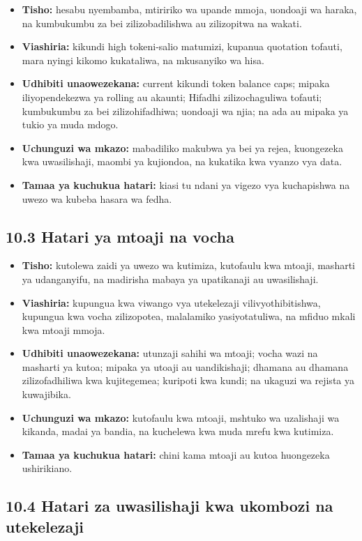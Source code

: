 \documentclass[11pt]{article}
\begin{document}
\begin{itemize}[leftmargin=*]
\item \textbf{Tisho:} hesabu nyembamba, mtiririko wa upande mmoja, uondoaji wa haraka, na kumbukumbu za bei zilizobadilishwa au zilizopitwa na wakati.
\item \textbf{Viashiria:} kikundi high tokeni-salio matumizi, kupanua quotation tofauti, mara nyingi kikomo kukataliwa, na mkusanyiko wa hisa.
\item \textbf{Udhibiti unaowezekana:} current kikundi token balance caps; mipaka iliyopendekezwa ya rolling au akaunti; Hifadhi zilizochaguliwa tofauti; kumbukumbu za bei zilizohifadhiwa; uondoaji wa njia; na ada au mipaka ya tukio ya muda mdogo.
\item \textbf{Uchunguzi wa mkazo:} mabadiliko makubwa ya bei ya rejea, kuongezeka kwa uwasilishaji, maombi ya kujiondoa, na kukatika kwa vyanzo vya data.
\item \textbf{Tamaa ya kuchukua hatari:} kiasi tu ndani ya vigezo vya kuchapishwa na uwezo wa kubeba hasara wa fedha.
\end{itemize}
\subsection*{10.3 Hatari ya mtoaji na vocha}

\begin{itemize}[leftmargin=*]
\item \textbf{Tisho:} kutolewa zaidi ya uwezo wa kutimiza, kutofaulu kwa mtoaji, masharti ya udanganyifu, na madirisha mabaya ya upatikanaji au uwasilishaji.
\item \textbf{Viashiria:} kupungua kwa viwango vya utekelezaji vilivyothibitishwa, kupungua kwa vocha zilizopotea, malalamiko yasiyotatuliwa, na mfiduo mkali kwa mtoaji mmoja.
\item \textbf{Udhibiti unaowezekana:} utunzaji sahihi wa mtoaji; vocha wazi na masharti ya kutoa; mipaka ya utoaji au uandikishaji; dhamana au dhamana zilizofadhiliwa kwa kujitegemea; kuripoti kwa kundi; na ukaguzi wa rejista ya kuwajibika.
\item \textbf{Uchunguzi wa mkazo:} kutofaulu kwa mtoaji, mshtuko wa uzalishaji wa kikanda, madai ya bandia, na kuchelewa kwa muda mrefu kwa kutimiza.
\item \textbf{Tamaa ya kuchukua hatari:} chini kama mtoaji au kutoa huongezeka ushirikiano.
\end{itemize}
\subsection*{10.4 Hatari za uwasilishaji kwa ukombozi na utekelezaji}
\end{document}
